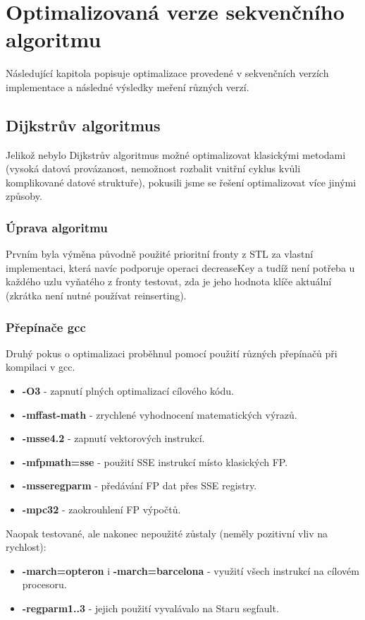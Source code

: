 \documentclass[a4paper,11pt]{article}
\begin{document}
\section{Optimalizovaná verze sekvenčního algoritmu}
Následující kapitola popisuje optimalizace provedené v sekvenčních verzích implementace a následné výsledky meření různých verzí.

\subsection{Dijkstrův algoritmus}
Jelikož nebylo Dijkstrův algoritmus možné optimalizovat klasickými metodami (vysoká datová provázanost, nemožnost rozbalit vnitřní cyklus kvůli komplikované datové struktuře), pokusili jsme se řešení optimalizovat více jinými způsoby. 
\par
\subsubsection{Úprava algoritmu}
Prvním byla výměna původně použité prioritní fronty z STL za vlastní implementaci, která navíc podporuje operaci decreaseKey a tudíž není po\-třeba u každého uzlu vyňatého z fronty testovat, zda je jeho hodnota klíče aktuální (zkrátka není nutné používat reinserting).
\subsubsection{Přepínače gcc}
Druhý pokus o optimalizaci proběhnul pomocí použití různých přepínačů při kompilaci v gcc.
\begin{itemize}
 \item \textbf{-O3} - zapnutí plných optimalizací cílového kódu.
 \item \textbf{-mffast-math} - zrychlené vyhodnocení matematických výrazů.
 \item \textbf{-msse4.2} - zapnutí vektorových instrukcí.
 \item \textbf{-mfpmath=sse} - použití SSE instrukcí místo klasických FP.
 \item \textbf{-msseregparm} - předávání FP dat přes SSE registry.
 \item \textbf{-mpc32} - zaokrouhlení FP výpočtů.
\end{itemize}
 Naopak testované, ale nakonec nepoužité zůstaly (neměly pozitivní vliv na rychlost): 
\begin{itemize}
 \item \textbf{-march=opteron} i \textbf{-march=barcelona}  - využití všech instrukcí na cílovém procesoru.
 \item \textbf{-regparm1..3} - jejich použití vyvalávalo na Staru segfault.
\end{itemize}
\end{document}
